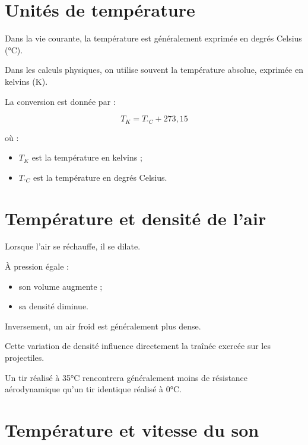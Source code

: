 \section{Unités de température}

Dans la vie courante, la température est généralement exprimée en degrés
Celsius (°C).

Dans les calculs physiques, on utilise souvent la température absolue,
exprimée en kelvins (K).

La conversion est donnée par :

\begin{equation}
T_K = T_{^\circ C} + 273,15
\end{equation}

où :

\begin{itemize}
\item $T_K$ est la température en kelvins ;
\item $T_{^\circ C}$ est la température en degrés Celsius.
\end{itemize}

\section{Température et densité de l'air}

Lorsque l'air se réchauffe, il se dilate.

À pression égale :

\begin{itemize}
\item son volume augmente ;
\item sa densité diminue.
\end{itemize}

Inversement, un air froid est généralement plus dense.

Cette variation de densité influence directement la traînée exercée sur les
projectiles.

\begin{exemple}

Un tir réalisé à 35°C rencontrera généralement moins de résistance
aérodynamique qu'un tir identique réalisé à 0°C.

\end{exemple}

\section{Température et vitesse du son}

